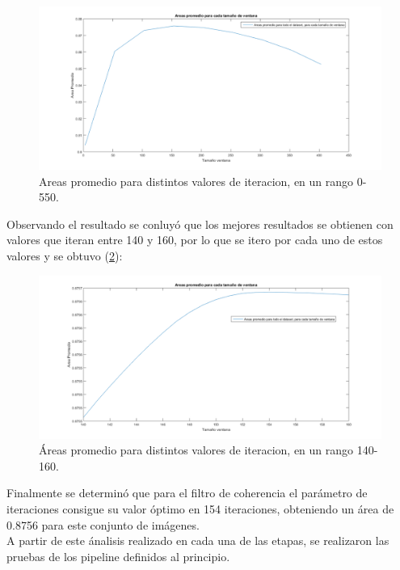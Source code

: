 \begin{figure}[H]
	{
	\centering
	\includegraphics[width=1\textwidth]{Figures/CoherenciaRangoGrande}
	\caption[An Electron]{Areas promedio para distintos valores de iteracion, en un rango 0-550.}
	\label{fig:coherencia}
	}
\end{figure}

Observando el resultado se conluy\'o que los mejores resultados se obtienen con valores que iteran entre 140 y 160, por lo que se itero por cada uno de estos valores y se obtuvo (\ref{fig:coherenciaRangoChico}):

\begin{figure}[H]
	{
	\centering
	\includegraphics[width=1\textwidth]{Figures/CoherenciaRangoChico}
	\caption[An Electron]{\'Areas promedio para distintos valores de iteracion, en un rango 140-160.}
	\label{fig:coherenciaRangoChico}
	}
\end{figure}

Finalmente se determin\'o que para el filtro de coherencia el parámetro de iteraciones consigue su valor \'optimo en 154 iteraciones, obteniendo un área de 0.8756 para este conjunto de im\'agenes.\\

A partir de este  \'analisis realizado en cada una de las etapas, se realizaron las pruebas de los pipeline definidos al principio. 


